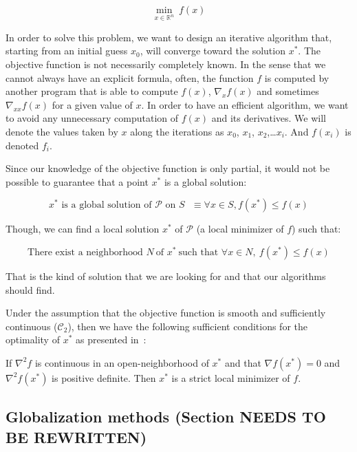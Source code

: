 \begin{equation}
  \min_{x\in\mathbb{R}^n}\ {f(x)}
\label{eq:unconstrainedOptim}
\end{equation}

In order to solve this problem, we want to design an iterative algorithm that, starting from an initial guess $x_0$, will converge toward the solution $x^*$.
The objective function is not necessarily completely known.
In the sense that we cannot always have an explicit formula, often, the function $f$ is computed by another program that is able to compute $f(x)$, $\nabla_x f(x)$ and sometimes $\nabla_{xx} f(x)$ for a given value of $x$.
In order to have an efficient algorithm, we want to avoid any unnecessary computation of $f(x)$ and its derivatives.
We will denote the values taken by $x$ along the iterations as $x_0$, $x_1$, $x_2$,\ldots $x_i$.
And $f(x_i)$ is denoted $f_i$.

Since our knowledge of the objective function is only partial, it would not be possible to guarantee that a point $x^*$ is a global solution:

\begin{equation}
  \text{$x^*$ is a global solution of $\mathcal{P}$ on $\mathit{S}$ } \equiv \forall x \in \mathit{S}, f(x^*) \leq f(x)
\end{equation}

Though, we can find a local solution $x^*$ of $\mathcal{P}$ (a local minimizer of $f$) such that:

\begin{equation}
  \text{There exist a neighborhood } \mathit{N}\ \text{of }x^*\ \text{such that }\forall x\in \mathit{N}, \ f(x^*) \leq f(x)
\end{equation}

That is the kind of solution that we are looking for and that our algorithms should find.

Under the assumption that the objective function is smooth and sufficiently continuous ($\mathcal{C}_2$), then we have the following sufficient conditions for the optimality of $x^*$ as presented in~\cite{nocedal:book:2006}:

\begin{theorem}
  If $\nabla^2f$ is continuous in an open-neighborhood of $x^*$ and that $\nabla f(x^*)=0$ and $\nabla^2 f(x^*)$ is positive definite.
  Then $x^*$ is a strict local minimizer of $f$.
\label{optimalityTheorem}
\end{theorem}

\subsection{Globalization methods (Section NEEDS TO BE REWRITTEN)}

